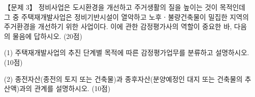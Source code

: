 \begin{longquestion}{【문제 3】}
정비사업은 도시환경을 개선하고 주거생활의 질을 높이는 것이 목적인데 그 중 주택재개발사업은 정비기반시설이 열악하고 노후ㆍ불량건축물이 밀집한 지역의 주거환경을 개선하기 위한 사업이다. 이에 관한 감정평가사의 역할이 중요한 바, 다음의 물음에 답하시오. (20점) \par
\medskip\noindent (1) 주택재개발사업의 추진 단계별 목적에 따른 감정평가업무를 분류하고 설명하시오. (10점) \par
\medskip\noindent (2) 종전자산(종전의 토지 또는 건축물)과 종후자산(분양예정인 대지 또는 건축물의 추산액)과의 관계를 설명하시오. (10점) \par
\end{longquestion}
